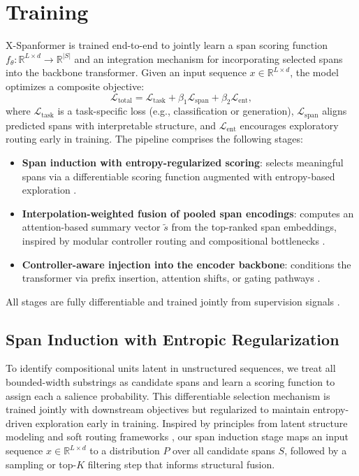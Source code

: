 \section{Training}

X-Spanformer is trained end-to-end to jointly learn a span scoring function
\(f_\theta : \mathbb{R}^{L \times d} \rightarrow \mathbb{R}^{|S|}\)
and an integration mechanism for incorporating selected spans into the backbone transformer.
Given an input sequence \(x \in \mathbb{R}^{L \times d}\), the model optimizes a composite objective:
\[
\mathcal{L}_{\text{total}} = \mathcal{L}_{\text{task}} + \beta_1 \mathcal{L}_{\text{span}} + \beta_2 \mathcal{L}_{\text{ent}},
\]
where \(\mathcal{L}_{\text{task}}\) is a task-specific loss (e.g., classification or generation),
\(\mathcal{L}_{\text{span}}\) aligns predicted spans with interpretable structure, and
\(\mathcal{L}_{\text{ent}}\) encourages exploratory routing early in training.
The pipeline comprises the following stages:

\begin{itemize}
  \item \textbf{Span induction with entropy-regularized scoring}: selects meaningful spans via a differentiable scoring function augmented with entropy-based exploration \cite{joshi2020spanbert, he2020syntax, raffel2020exploring}.
  \item \textbf{Interpolation-weighted fusion of pooled span encodings}: computes an attention-based summary vector \(\tilde{s}\) from the top-ranked span embeddings, inspired by modular controller routing and compositional bottlenecks \cite{shazeer2017outrageously, gupta2022molt}.
  \item \textbf{Controller-aware injection into the encoder backbone}: conditions the transformer via prefix insertion, attention shifts, or gating pathways \cite{li2021prefix, hu2021lora, shaw2018self}.
\end{itemize}

All stages are fully differentiable and trained jointly from supervision signals \cite{raffel2020t5, lewis2020pretrained}.

\subsection{Span Induction with Entropic Regularization}

To identify compositional units latent in unstructured sequences, we treat all bounded-width substrings as candidate spans and learn a scoring function to assign each a salience probability.
This differentiable selection mechanism is trained jointly with downstream objectives but regularized to maintain entropy-driven exploration early in training.
Inspired by principles from latent structure modeling \cite{he2020syntax, joshi2020spanbert} and soft routing frameworks \cite{shazeer2017outrageously},
our span induction stage maps an input sequence \(x \in \mathbb{R}^{L \times d}\) to a distribution \(P\) over all candidate spans \(S\), followed by a sampling or top-\(K\) filtering step that informs structural fusion.

